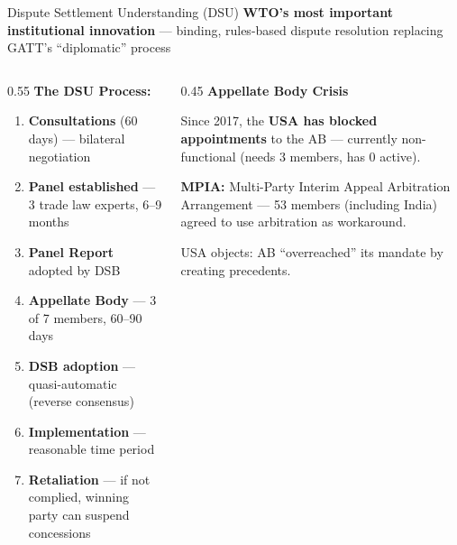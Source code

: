 \documentclass[
  ignorenonframetext,
  aspectratio=169,
]{beamer}
\makeatletter
\providecommand{\tightlist}{%
  \setlength{\itemsep}{0pt}\setlength{\parskip}{0pt}}
\let\quarto@originallabel\label
\DeclareRobustCommand*{\label}[1]{\quarto@originallabel{#1}}
\makeatother
\begin{document}
\begin{frame}{Dispute Settlement Understanding (DSU)}
\label{dispute-settlement-understanding-dsu}
\textbf{WTO's most important institutional innovation} --- binding,
rules-based dispute resolution replacing GATT's ``diplomatic'' process

\begin{columns}[T]
\begin{column}{0.55\linewidth}
\textbf{The DSU Process:}

\begin{enumerate}
\tightlist
\item
  \textbf{Consultations} (60 days) --- bilateral negotiation
\item
  \textbf{Panel established} --- 3 trade law experts, 6--9 months
\item
  \textbf{Panel Report} adopted by DSB
\item
  \textbf{Appellate Body} --- 3 of 7 members, 60--90 days
\item
  \textbf{DSB adoption} --- quasi-automatic (reverse consensus)
\item
  \textbf{Implementation} --- reasonable time period
\item
  \textbf{Retaliation} --- if not complied, winning party can suspend
  concessions
\end{enumerate}
\end{column}

\begin{column}{0.45\linewidth}
\textbf{Appellate Body Crisis}

Since 2017, the \textbf{USA has blocked appointments} to the AB ---
currently non-functional (needs 3 members, has 0 active).

\textbf{MPIA:} Multi-Party Interim Appeal Arbitration Arrangement --- 53
members (including India) agreed to use arbitration as workaround.

USA objects: AB ``overreached'' its mandate by creating precedents.
\end{column}
\end{columns}
\end{frame}
\end{document}
